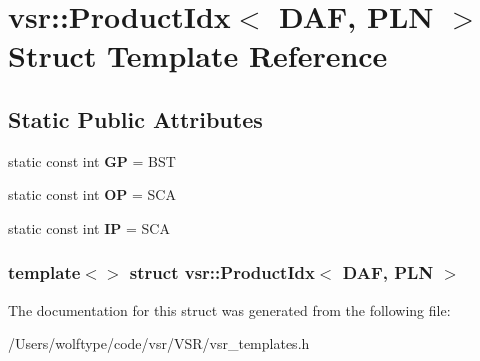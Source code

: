 \hypertarget{structvsr_1_1_product_idx_3_01_d_a_f_00_01_p_l_n_01_4}{\section{vsr\-:\-:Product\-Idx$<$ D\-A\-F, P\-L\-N $>$ Struct Template Reference}
\label{structvsr_1_1_product_idx_3_01_d_a_f_00_01_p_l_n_01_4}
}
\subsection*{Static Public Attributes}
\begin{DoxyCompactItemize}
\item 
\hypertarget{structvsr_1_1_product_idx_3_01_d_a_f_00_01_p_l_n_01_4_a3ded9f7c6cae699be3ed204b550d1f5c}{static const int {\bfseries G\-P} = B\-S\-T}\label{structvsr_1_1_product_idx_3_01_d_a_f_00_01_p_l_n_01_4_a3ded9f7c6cae699be3ed204b550d1f5c}

\item 
\hypertarget{structvsr_1_1_product_idx_3_01_d_a_f_00_01_p_l_n_01_4_a2d96d64a8f88d5e966269f52c7573a4b}{static const int {\bfseries O\-P} = S\-C\-A}\label{structvsr_1_1_product_idx_3_01_d_a_f_00_01_p_l_n_01_4_a2d96d64a8f88d5e966269f52c7573a4b}

\item 
\hypertarget{structvsr_1_1_product_idx_3_01_d_a_f_00_01_p_l_n_01_4_a372e69b2aab61004718413e16e0d9d00}{static const int {\bfseries I\-P} = S\-C\-A}\label{structvsr_1_1_product_idx_3_01_d_a_f_00_01_p_l_n_01_4_a372e69b2aab61004718413e16e0d9d00}

\end{DoxyCompactItemize}
\subsubsection*{template$<$$>$ struct vsr\-::\-Product\-Idx$<$ D\-A\-F, P\-L\-N $>$}



The documentation for this struct was generated from the following file\-:\begin{DoxyCompactItemize}
\item 
/\-Users/wolftype/code/vsr/\-V\-S\-R/vsr\-\_\-templates.\-h\end{DoxyCompactItemize}
